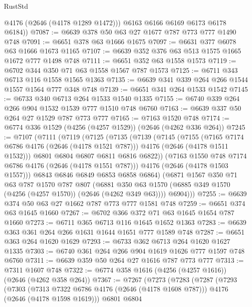 \begin{lexlean}{RustStd}
\begin{coremodule}
          @4176
          (@2646 (@4178 @1289 @1472)))
        @6163
        @6166
        @6169
        @6173
        @6178
        @6184))
@7087 := @6639 @378 @50 @63 @27 @1677 @787 @773 @777 @1490 @748
@7091 := @6651 @378 @63 @1666 @1675
@7097 := @6631 @377 @6078 @63 @1666 @1673 @1165
@7107 := @6639 @352 @376 @63 @513 @1575 @1665 @1672 @777 @1498 @748
@7111 := @6651 @352 @63 @1558 @1573
@7119 := @6702 @344 @350 @71 @63 @1558 @1567 @787 @1573
@7125 := @6711 @343 @6713 @116 @1558 @1565 @1363
@7135 := @6639 @341 @339 @264 @266 @1544 @1557 @1564 @777 @348 @748
@7139 := @6651 @341 @264 @1533 @1542
@7145 := @6733 @340 @6713 @264 @1533 @1540 @1335
@7155 := @6740 @339 @264 @266 @904 @1532 @1539 @777 @1510 @748 @6760
@7163 := @6639 @337 @50 @264 @27 @1529 @787 @773 @777
@7165 := @7163 @1520 @748
@7174 := @6774 @336 @1529 (@4256 (@4257 @1529)) (@2646 (@4262 @336 @264))
@7245 := @7107
    (@7111
      (@7119
        (@7125
          (@7135
            (@7139
              (@7145
                (@7155
                  (@7165 @7174 @6786 @4176 (@2646 (@4178 @1521 @787)))
                  @4176
                  (@2646 (@4178 @1511 @1532)))
                @6801
                @6804
                @6807
                @6811
                @6816
                @6822))
            (@7163 @1550 @748 @7174 @6786 @4176 (@2646 (@4178 @1551 @787)))
            @4176
            (@2646 (@4178 @1503 @1557)))
          @6843
          @6846
          @6849
          @6853
          @6858
          @6864)
        (@6871
          @1567
          @350
          @71
          @63
          @787
          @1570
          @787
          @807
          (@6881 @350 @63 @1570 (@6885 @349 @1570 (@4256 (@4257 @1570)) (@2646 (@4262 @349 @63))))
          @6904)))
@7255 := @6639 @374 @50 @63 @27 @1662 @787 @773 @777 @1581 @748
@7259 := @6651 @374 @63 @1645 @1660
@7267 := @6702 @366 @372 @71 @63 @1645 @1654 @787 @1660
@7273 := @6711 @365 @6713 @116 @1645 @1652 @1363
@7283 := @6639 @363 @361 @264 @266 @1631 @1644 @1651 @777 @1589 @748
@7287 := @6651 @363 @264 @1620 @1629
@7293 := @6733 @362 @6713 @264 @1620 @1627 @1335
@7303 := @6740 @361 @264 @266 @904 @1619 @1626 @777 @1597 @748 @6760
@7311 := @6639 @359 @50 @264 @27 @1616 @787 @773 @777
@7313 := @7311 @1607 @748
@7322 := @6774 @358 @1616 (@4256 (@4257 @1616)) (@2646 (@4262 @358 @264))
@7367 := @7267
    (@7273
      (@7283
        (@7287
          (@7293
            (@7303
              (@7313 @7322 @6786 @4176 (@2646 (@4178 @1608 @787)))
              @4176
              (@2646 (@4178 @1598 @1619)))
            @6801
            @6804

\end{coremodule}
\end{lexlean}
